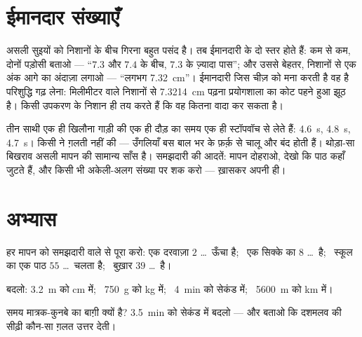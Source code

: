 \section{ईमानदार संख्याएँ}

\begin{remark}[निशानों के बीच]\label{rem:g6:measurement-in-science:between}
असली सुइयों को निशानों के बीच गिरना बहुत पसंद है। तब ईमानदारी के दो
स्तर होते हैं: कम से कम, दोनों पड़ोसी बताओ --- ``$7.3$ और $7.4$ के
बीच, $7.3$ के ज़्यादा पास''; और उससे बेहतर, निशानों से एक अंक आगे का
अंदाज़ा लगाओ --- ``लगभग \qty{7.32}{cm}''। ईमानदारी जिस चीज़ को मना
करती है वह है परिशुद्धि गढ़ लेना: मिलीमीटर वाले निशानों से
\qty{7.3214}{cm} पढ़ना प्रयोगशाला का कोट पहने हुआ झूठ है। किसी उपकरण
के निशान ही तय करते हैं कि वह कितना वादा कर सकता है।
\end{remark}

\begin{example}[दो बार मापो, ज़्यादा भरोसा करो]\label{ex:g6:measurement-in-science:repeat}
तीन साथी एक ही खिलौना गाड़ी की एक ही दौड़ का समय एक ही स्टॉपवॉच से
लेते हैं: \qty{4.6}{s}, \qty{4.8}{s}, \qty{4.7}{s}। किसी ने ग़लती
नहीं की --- उँगलियाँ बस बाल भर के फ़र्क़ से चालू और बंद होती हैं।
थोड़ा-सा बिखराव असली मापन की सामान्य साँस है। समझदारी की आदतें: मापन
दोहराओ, देखो कि पाठ कहाँ जुटते हैं, और किसी भी अकेली-अलग संख्या पर
शक करो --- ख़ासकर अपनी ही।
\end{example}

\section{अभ्यास}

\begin{exercise}[$\star$]\label{exo:g6:measurement-in-science:1}
हर मापन को समझदारी वाले  से पूरा करो: एक दरवाज़ा $2$ \dots\
ऊँचा है; \ एक सिक्के का  $8$ \dots\ है; \ स्कूल का एक पाठ
$55$ \dots\ चलता है; \ बुख़ार $39$ \dots\ है।
\end{exercise}

\begin{exercise}[$\star$]\label{exo:g6:measurement-in-science:2}
बदलो: \qty{3.2}{m} को \unit{cm} में; \ \qty{750}{g} को \unit{kg}
में; \ \qty{4}{min} को सेकंड में; \ \qty{5600}{m} को \unit{km} में।
\end{exercise}

\begin{exercise}[$\star$]\label{exo:g6:measurement-in-science:3}
समय मात्रक-कुनबे का बाग़ी क्यों है? \qty{3.5}{min} को सेकंड में
बदलो --- और बताओ कि दशमलव की सीढ़ी कौन-सा ग़लत उत्तर देती।
\end{exercise}

